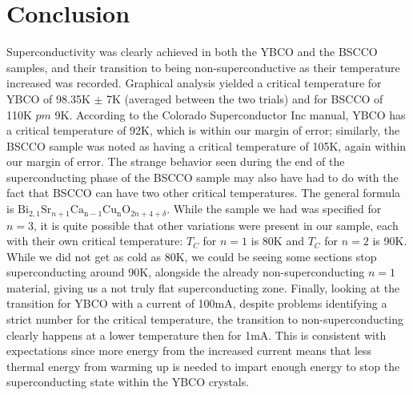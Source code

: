\documentclass[prb,preprint]{revtex4-1}
\begin{document}
\section{Conclusion}

Superconductivity was clearly achieved in both the YBCO and the BSCCO samples, and their transition to being non-superconductive as their temperature increased was recorded. Graphical analysis yielded a critical temperature for YBCO of 98.35K $\pm$ 7K (averaged between the two trials) and for BSCCO of 110K $pm$ 9K. According to the Colorado Superconductor Inc manual, YBCO has a critical temperature of 92K, which is within our margin of error; similarly, the BSCCO sample was noted as having a critical temperature of 105K, again within our margin of error. The strange behavior seen during the end of the superconducting phase of the BSCCO sample may also have had to do with the fact that BSCCO can have two other critical temperatures. The general formula is $\text{Bi}_{2,1}\text{Sr}_{n+1}\text{Ca}_{\text{n}-1}\text{Cu}_{\text{n}}\text{O}_{2n+4+\delta}$. While the sample we had was specified for $n=3$, it is quite possible that other variations were present in our sample, each with their own critical temperature: $T_C$ for $n=1$ is 80K and $T_C$ for $n=2$ is 90K. \cite{colo} While we did not get as cold as 80K, we could be seeing some sections stop superconducting around 90K, alongside the already non-superconducting $n=1$ material, giving us a not truly flat superconducting zone. Finally, looking at the transition for YBCO with a current of 100mA, despite problems identifying a strict number for the critical temperature, the transition to non-superconducting clearly happens at a lower temperature then for 1mA. This is consistent with expectations since more energy from the increased current means that less thermal energy from warming up is needed to impart enough energy to stop the superconducting state within the YBCO crystals.
\end{document}

